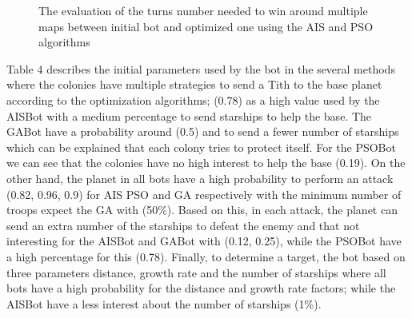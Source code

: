 \documentclass[]{interact}
\theoremstyle{plain}%
\theoremstyle{definition}
\theoremstyle{remark}
\begin{document}
\begin{figure}
\begin{center}
\end{center}
\caption{The evaluation of the turns number needed to win around multiple maps between initial bot and optimized one using the AIS and PSO algorithms}
\end{figure}


Table 4 describes the initial parameters used by the bot in the several methods where the colonies have multiple strategies to send a Tith to the base planet according to the optimization algorithms; (0.78) as a high value used by the AISBot with a medium percentage to send starships to help the base. The GABot have a probability around (0.5) and to send a fewer number of starships which can be explained that each colony tries to protect itself. For the PSOBot we can see that the colonies have no high interest to help the base (0.19). On the other hand, the planet in all bots have a high probability to perform an attack (0.82, 0.96, 0.9) for AIS PSO and GA respectively with the minimum number of troops expect the GA with (50\%). Based on this, in each attack, the planet can send an extra number of the starships to defeat the enemy and that not interesting for the AISBot and GABot with (0.12, 0.25), while the PSOBot have a high percentage for this (0.78). Finally, to determine a target, the bot based on three parameters distance, growth rate and the number of starships where all bots have a high probability for the distance and growth rate factors; while the AISBot have a less interest about the number of starships (1\%).\\
\end{document}
